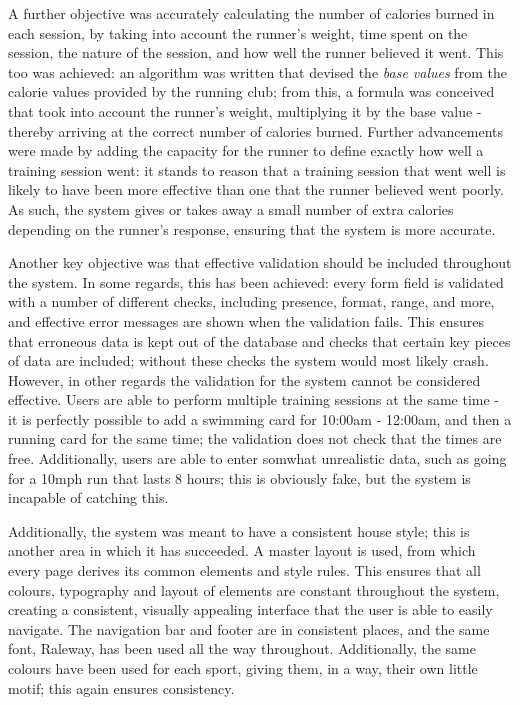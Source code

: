 \documentclass{article}[12pt,a4paper]
\begin{document}
{A further objective was accurately calculating the number of calories burned in each session, by taking into account the runner’s weight, time spent on the session, the nature of the session, and how well the runner believed it went. This too was achieved: an algorithm was written that devised the \textit{base values} from the calorie values provided by the running club; from this, a formula was conceived that took into account the runner's weight, multiplying it by the base value - thereby arriving at the correct number of calories burned. Further advancements were made by adding the capacity for the runner to define exactly how well a training session went: it stands to reason that a training session that went well is likely to have been more effective than one that the runner believed went poorly. As such, the system gives or takes away a small number of extra calories depending on the runner's response, ensuring that the system is more accurate.

Another key objective was that effective validation should be included throughout the system. In some regards, this has been achieved: every form field is validated with a number of different checks, including presence, format, range, and more, and effective error messages are shown when the validation fails. This ensures that erroneous data is kept out of the database and checks that certain key pieces of data are included; without these checks the system would most likely crash. However, in other regards the validation for the system cannot be considered effective. Users are able to perform multiple training sessions at the same time - it is perfectly possible to add a swimming card for 10:00am - 12:00am, and then a running card for the same time; the validation does not check that the times are free. Additionally, users are able to enter somwhat unrealistic data, such as going for a 10mph run that lasts 8 hours; this is obviously fake, but the system is incapable of catching this.

Additionally, the system was meant to have a consistent house style; this is another area in which it has succeeded. A master layout is used, from which every page derives its common elements and style rules. This ensures that all colours, typography and layout of elements are constant throughout the system, creating a consistent, visually appealing interface that the user is able to easily navigate. The navigation bar and footer are in consistent places, and the same font, Raleway, has been used all the way throughout. Additionally, the same colours have been used for each sport, giving them, in a way, their own little motif; this again ensures consistency.

}
\end{document}
